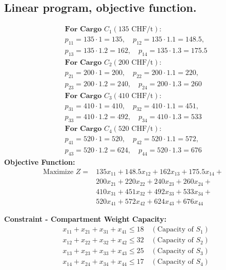 \documentclass[unicode,11pt,a4paper,oneside,numbers=endperiod,openany]{scrartcl}
\begin{document}
\subsection{Linear program, objective function.}
\begin{equation*}
\begin{aligned}
& \textbf{For Cargo } C_1 (135 \text{ CHF/t}): \\
& p_{11} = 135 \cdot 1 = 135, \quad p_{12} = 135 \cdot 1.1 = 148.5, \\
& p_{13} = 135 \cdot 1.2 = 162, \quad p_{14} = 135 \cdot 1.3 = 175.5 \\
& \textbf{For Cargo } C_2 (200 \text{ CHF/t}): \\
& p_{21} = 200 \cdot 1 = 200, \quad p_{22} = 200 \cdot 1.1 = 220, \\
& p_{23} = 200 \cdot 1.2 = 240, \quad p_{24} = 200 \cdot 1.3 = 260 \\
& \textbf{For Cargo } C_3 (410 \text{ CHF/t}): \\
& p_{31} = 410 \cdot 1 = 410, \quad p_{32} = 410 \cdot 1.1 = 451, \\
& p_{33} = 410 \cdot 1.2 = 492, \quad p_{34} = 410 \cdot 1.3 = 533 \\
& \textbf{For Cargo } C_4 (520 \text{ CHF/t}): \\
& p_{41} = 520 \cdot 1 = 520, \quad p_{42} = 520 \cdot 1.1 = 572, \\
& p_{43} = 520 \cdot 1.2 = 624, \quad p_{44} = 520 \cdot 1.3 = 676
\end{aligned}
\end{equation*}
\textbf{Objective Function:}
\[
\begin{aligned}
\text{Maximize } Z = & 135x_{11} + 148.5x_{12} + 162x_{13} + 175.5x_{14} + \\
                    & 200x_{21} + 220x_{22} + 240x_{23} + 260x_{24} + \\
                    & 410x_{31} + 451x_{32} + 492x_{33} + 533x_{34} + \\
                    & 520x_{41} + 572x_{42} + 624x_{43} + 676x_{44}
\end{aligned}
\]

\textbf{Constraint - Compartment Weight Capacity:}
\[
\begin{aligned}
& x_{11} + x_{21} + x_{31} + x_{41} \leq 18 \quad (\text{Capacity of } S_1) \\
& x_{12} + x_{22} + x_{32} + x_{42} \leq 32 \quad (\text{Capacity of } S_2) \\
& x_{13} + x_{23} + x_{33} + x_{43} \leq 25 \quad (\text{Capacity of } S_3) \\
& x_{14} + x_{24} + x_{34} + x_{44} \leq 17 \quad (\text{Capacity of } S_4)
\end{aligned}
\]
\end{document}
